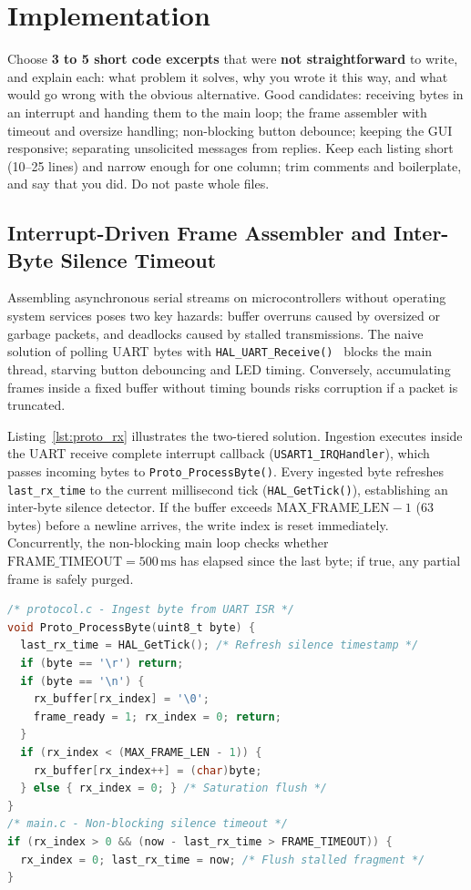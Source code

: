 \section{Implementation}
\label{sec:impl}

\begin{guidance}
Choose \textbf{3 to 5 short code excerpts} that were \textbf{not straightforward}
to write, and explain each: what problem it solves, why you wrote it this way,
and what would go wrong with the obvious alternative. Good candidates:
receiving bytes in an interrupt and handing them to the main loop; the frame
assembler with timeout and oversize handling; non-blocking button debounce;
keeping the GUI responsive; separating unsolicited messages from replies.
Keep each listing short (10--25 lines) and narrow enough for one column; trim
comments and boilerplate, and say that you did. Do not paste whole files.
\end{guidance}

\subsection{Interrupt-Driven Frame Assembler and Inter-Byte Silence Timeout}
Assembling asynchronous serial streams on microcontrollers without operating system services poses two key hazards: buffer overruns caused by oversized or garbage packets, and deadlocks caused by stalled transmissions. The naive solution of polling UART bytes with \texttt{HAL\_UART\_Receive()}~\cite{um1785} blocks the main thread, starving button debouncing and LED timing. Conversely, accumulating frames inside a fixed buffer without timing bounds risks corruption if a packet is truncated.

Listing~\ref{lst:proto_rx} illustrates the two-tiered solution. Ingestion executes inside the UART receive complete interrupt callback (\texttt{USART1\_IRQHandler}), which passes incoming bytes to \texttt{Proto\_ProcessByte()}. Every ingested byte refreshes \texttt{last\_rx\_time} to the current millisecond tick (\texttt{HAL\_GetTick()}), establishing an inter-byte silence detector. If the buffer exceeds $\text{MAX\_FRAME\_LEN} - 1$ (63 bytes) before a newline arrives, the write index is reset immediately. Concurrently, the non-blocking main loop checks whether $\text{FRAME\_TIMEOUT} = 500\,\text{ms}$ has elapsed since the last byte; if true, any partial frame is safely purged.

\begin{lstlisting}[language=C, caption={Interrupt ingestion and inter-byte timeout (\texttt{protocol.c}, \texttt{main.c}).}, label=lst:proto_rx]
/* protocol.c - Ingest byte from UART ISR */
void Proto_ProcessByte(uint8_t byte) {
  last_rx_time = HAL_GetTick(); /* Refresh silence timestamp */
  if (byte == '\r') return;
  if (byte == '\n') {
    rx_buffer[rx_index] = '\0';
    frame_ready = 1; rx_index = 0; return;
  }
  if (rx_index < (MAX_FRAME_LEN - 1)) {
    rx_buffer[rx_index++] = (char)byte;
  } else { rx_index = 0; } /* Saturation flush */
}
/* main.c - Non-blocking silence timeout */
if (rx_index > 0 && (now - last_rx_time > FRAME_TIMEOUT)) {
  rx_index = 0; last_rx_time = now; /* Flush stalled fragment */
}
\end{lstlisting}

